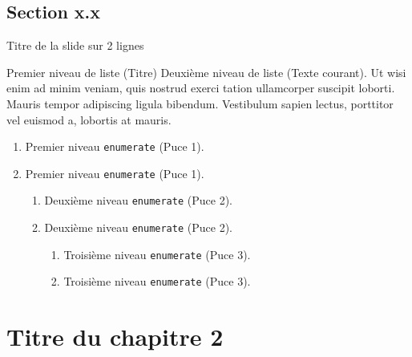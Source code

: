 \documentclass[A4,svgnames,9pt,aspectratio=169]{beamer}
\begin{document}
\subsection{Section x.x}

\begin{frame}{Titre de la slide \newline sur 2 lignes}
    \begin{block}{Premier niveau de liste (Titre)}
       Deuxième niveau de liste (Texte courant). Ut wisi enim ad minim veniam, quis nostrud exerci tation
       ullamcorper suscipit loborti. Mauris tempor adipiscing ligula bibendum. Vestibulum sapien lectus,
       porttitor vel euismod a, lobortis at mauris.
      \begin{enumerate}
         \item Premier niveau \texttt{enumerate} (Puce 1). 
         \item Premier niveau \texttt{enumerate} (Puce 1). 
         \begin{enumerate}
            \item Deuxième niveau \texttt{enumerate} (Puce 2).
            \item Deuxième niveau \texttt{enumerate} (Puce 2).
            \begin{enumerate}
               \item Troisième niveau \texttt{enumerate} (Puce 3).
               \item Troisième niveau \texttt{enumerate} (Puce 3).
            \end{enumerate}
          \end{enumerate}
        \end{enumerate}
   \end{block}
\end{frame}


\section{Titre du chapitre 2}
\frame{\sectionpage}

\end{document}
